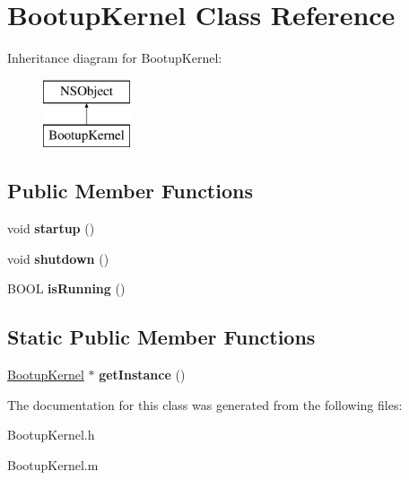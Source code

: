 \hypertarget{interface_bootup_kernel}{
\section{\-Bootup\-Kernel \-Class \-Reference}
\label{interface_bootup_kernel}
}
\-Inheritance diagram for \-Bootup\-Kernel\-:\begin{figure}[H]
\begin{center}
\leavevmode
\includegraphics[height=2.000000cm]{interface_bootup_kernel}
\end{center}
\end{figure}
\subsection*{\-Public \-Member \-Functions}
\begin{DoxyCompactItemize}
\item 
\hypertarget{interface_bootup_kernel_afe6589ba940f1a038de993e8b8e2f63c}{
void {\bfseries startup} ()}
\label{interface_bootup_kernel_afe6589ba940f1a038de993e8b8e2f63c}

\item 
\hypertarget{interface_bootup_kernel_a4065ac31dfc583c023e6035949b194ff}{
void {\bfseries shutdown} ()}
\label{interface_bootup_kernel_a4065ac31dfc583c023e6035949b194ff}

\item 
\hypertarget{interface_bootup_kernel_af740a50332c1cb2038890072d2ba6b8c}{
\-B\-O\-O\-L {\bfseries is\-Running} ()}
\label{interface_bootup_kernel_af740a50332c1cb2038890072d2ba6b8c}

\end{DoxyCompactItemize}
\subsection*{\-Static \-Public \-Member \-Functions}
\begin{DoxyCompactItemize}
\item 
\hypertarget{interface_bootup_kernel_a6fa0afa811f224e2a7b7687012025579}{
\hyperlink{interface_bootup_kernel}{\-Bootup\-Kernel} $\ast$ {\bfseries get\-Instance} ()}
\label{interface_bootup_kernel_a6fa0afa811f224e2a7b7687012025579}

\end{DoxyCompactItemize}


\-The documentation for this class was generated from the following files\-:\begin{DoxyCompactItemize}
\item 
\-Bootup\-Kernel.\-h\item 
\-Bootup\-Kernel.\-m\end{DoxyCompactItemize}
